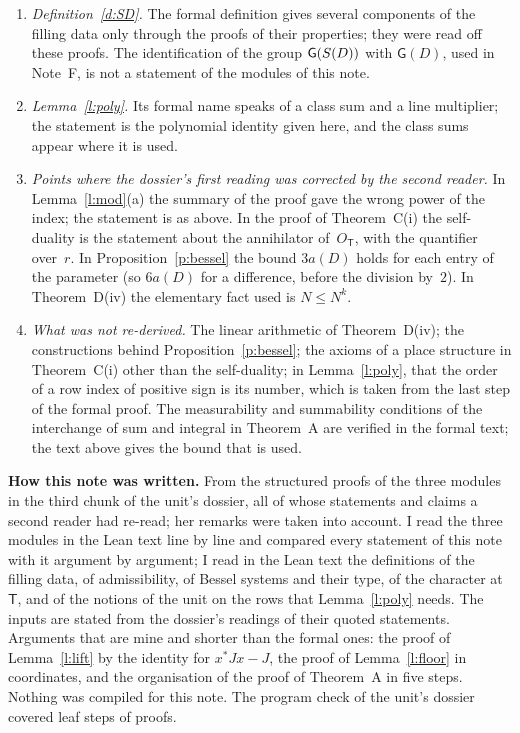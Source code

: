 \documentclass[11pt,a4paper]{article}
\newcommand{\m}[1]{\mbox{$#1$}}        %
\newcommand{\subhead}[1]{\par\addvspace{9pt plus 2pt}\Needspace{4\baselineskip}\noindent\textbf{#1}\enspace\ignorespaces}
\theoremstyle{plainx}
\theoremstyle{uprightx}
\newcommand{\sT}{\mathsf{T}}                        %
\newcommand{\GRes}[1]{\mathsf{G}(#1)}               %
\newcommand{\sGD}[1]{\mathsf{G}(#1)}                %
\begin{document}
\begin{enumerate}[leftmargin=1.6em,itemsep=3pt]
\item \emph{Definition~\ref{d:SD}.} The formal definition gives several components of the filling data only
through the proofs of their properties; they were read off these proofs. The identification of the group
\m{\GRes{\SD{D}}} with \m{\sGD{D}}, used in Note~F, is not a statement of the modules of this note.
\item \emph{Lemma~\ref{l:poly}.} Its formal name speaks of a class sum and a line multiplier; the statement is
the polynomial identity given here, and the class sums appear where it is used.
\item \emph{Points where the dossier's first reading was corrected by the second reader.} In
Lemma~\ref{l:mod}(a) the summary of the proof gave the wrong power of the index; the statement is as above. In
the proof of Theorem~C(i) the self-duality is the statement about the annihilator of~$O_{\sT}$, with the
quantifier over~$r$. In Proposition~\ref{p:bessel} the bound \m{3a(D)} holds for each entry of the parameter
(so \m{6a(D)} for a difference, before the division by~$2$). In Theorem~D(iv) the elementary fact used is
\m{N\le N^k}.
\item \emph{What was not re-derived.} The linear arithmetic of Theorem~D(iv); the constructions behind
Proposition~\ref{p:bessel}; the axioms of a place structure in Theorem~C(i) other than the self-duality; in
Lemma~\ref{l:poly}, that the order of a row index of positive sign is its number, which is taken from the last
step of the formal proof. The measurability and summability conditions of the interchange of sum and integral
in Theorem~A are verified in the formal text; the text above gives the bound that is used.
\end{enumerate}

\subhead{How this note was written.} From the structured proofs of the three modules in the third chunk of the
unit's dossier, all of whose statements and claims a second reader had re-read; her remarks were taken into
account. I read the three modules in the Lean text line by line and compared every statement of this note
with it argument by argument; I read in the Lean text the definitions of the filling data, of admissibility, of
Bessel systems and their type, of the character at~$\sT$, and of the notions of the unit on the rows that
Lemma~\ref{l:poly} needs. The inputs are stated from the dossier's readings of their quoted statements.
Arguments that are mine and shorter than the formal ones: the proof of Lemma~\ref{l:lift} by the identity for
\m{x^*Jx-J}, the proof of Lemma~\ref{l:floor} in coordinates, and the organisation of the proof of Theorem~A in
five steps. Nothing was compiled for this note. The program check of the unit's dossier covered \UnitSteps{}
leaf steps of \UnitProofs{} proofs.
\end{document}
